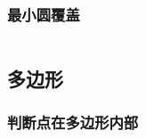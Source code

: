 \documentclass[landscape, oneside, a4paper, cs4size]{book}
\newcommand{\cppcode}[1]{
	\inputminted[mathescape,
	frame=lines,linenos]{cpp}{source/#1}
}
\begin{document}
\begin{multicols}{2}
\begin{spacing}{0.8}
\cppcode{computational-geometry/halfplaneintersection.cpp}





\subsubsection{最小圆覆盖}

\cppcode{computational-geometry/mincir.cpp}













\subsection{多边形}


\subsubsection{判断点在多边形内部}


\cppcode{computational-geometry/point-in-polygon.cpp}







\end{spacing}
\end{multicols}
\end{document}
